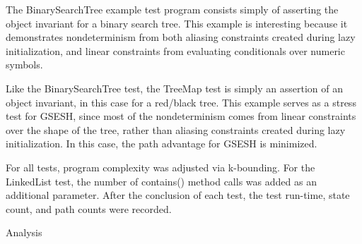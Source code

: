 The BinarySearchTree example test program consists simply of asserting the object invariant for a binary search tree. This example is interesting because it demonstrates nondeterminism from both aliasing constraints created during lazy initialization, and linear constraints from evaluating conditionals over numeric symbols. 

Like the BinarySearchTree test, the TreeMap test is simply an assertion of an object invariant, in this case for a red/black tree. This example serves as a stress test for GSESH, since most of the nondeterminism comes from linear constraints over the shape of the tree, rather than aliasing constraints created during lazy initialization. In this case, the path advantage for GSESH is minimized.

For all tests, program complexity was adjusted via k-bounding. For the LinkedList test, the number of contains() method calls was added as an additional parameter. After the conclusion of each test, the test run-time, state count, and path counts were recorded. 

Analysis